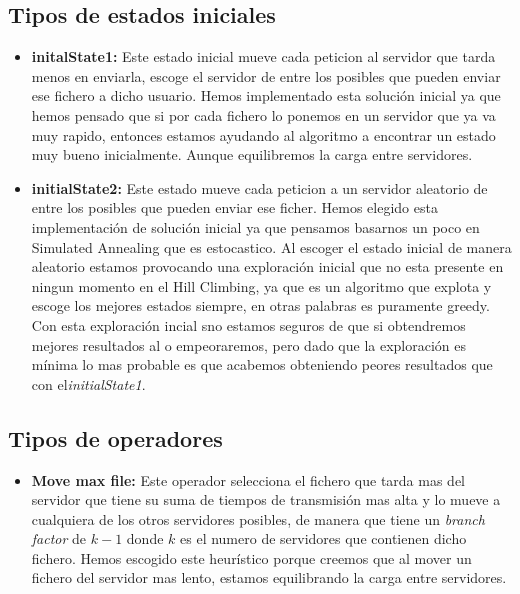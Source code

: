 \documentclass[a4paper,10pt]{report}
\begin{document}
        \subsection*{Tipos de estados iniciales}
            \begin{itemize}
                \item \textbf{initalState1:} Este estado inicial mueve cada peticion  al servidor que tarda menos 
                                             en enviarla, escoge el servidor de entre los posibles que pueden enviar 
                                             ese fichero a dicho usuario. Hemos implementado esta solución inicial ya que hemos
                                             pensado que si por cada fichero lo ponemos en un servidor que ya va muy rapido, entonces estamos 
                                             ayudando al algoritmo a encontrar un estado muy bueno inicialmente. Aunque equilibremos la carga entre
                                             servidores. 
                 \item \textbf{initialState2:} Este estado mueve cada peticion a un servidor aleatorio de entre 
                  los posibles que pueden enviar ese ficher. Hemos elegido esta implementación de solución inicial 
                  ya que pensamos basarnos un poco en Simulated Annealing que es estocastico. Al escoger el estado inicial 
                  de manera aleatorio estamos provocando una exploración inicial que no esta presente en ningun momento en 
                  el Hill Climbing, ya que es un algoritmo que explota y escoge los mejores estados siempre, en otras palabras es
                  puramente greedy. Con esta exploración incial sno estamos seguros de que si obtendremos mejores resultados al 
                  o empeoraremos, pero dado que la exploración es mínima lo mas probable es que acabemos obteniendo peores resultados 
                  que con el\textit{initialState1}.
            \end{itemize}
        
        \subsection*{Tipos de operadores}
            \begin{itemize}
                \item \textbf{Move max file:} Este operador selecciona el fichero que tarda mas del servidor que tiene
                                            su suma de tiempos de transmisión mas alta y lo mueve a cualquiera de los otros 
                                            servidores posibles, de manera que tiene un \textit{branch factor} de $k - 1$ donde 
                                            $k$ es el numero de servidores que contienen dicho fichero. Hemos escogido este heurístico 
                                            porque creemos que al mover un fichero del servidor mas lento, estamos equilibrando la carga
                                            entre servidores. 
            \end{itemize}
            
\end{document}
